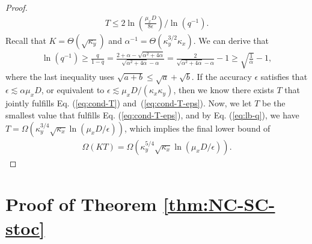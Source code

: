 \begin{proof}
\begin{align}
    T \le 2\ln \left( \frac{\mu_x D}{8 \epsilon}  \right) \Big / \ln (q^{-1}).    
\end{align}
Recall that $K = \Theta(\sqrt{\kappa_y})$ and $\alpha^{-1} = \Theta\left(\kappa_y^{3/2} \kappa_x \right)$. We can derive that
\begin{align} \label{eq:lb-q}
    \ln (q^{-1}) \ge \frac{q}{1-q} = \frac{2 + \alpha - \sqrt{\alpha^2 + 4 \alpha}}{\sqrt{\alpha^2 + 4 \alpha} - \alpha} = \frac{2}{\sqrt{\alpha^2 + 4\alpha} - \alpha} -1 \ge \sqrt{\frac{1}{\alpha}} - 1,
\end{align}
where the last inequality uses $\sqrt{a+b} \le \sqrt{a} + \sqrt{b}$.
If the accuracy $\epsilon$ satisfies that $\epsilon \lesssim \alpha \mu_x D$, or equivalent to $\epsilon \lesssim \mu_x D / (\kappa_x \kappa_y)$, then we know there exists $T$ that jointly fulfills 
 Eq. (\ref{eq:cond-T}) and~(\ref{eq:cond-T-eps}). Now,
we let $T$ be the smallest value that fulfills Eq. (\ref{eq:cond-T-eps}), and by Eq. (\ref{eq:lb-q}), we have 
$T = \Omega( \kappa_y^{3/4} \sqrt{\kappa_x}  \ln (\mu_x D/\epsilon))$, which implies the final lower bound of 
\begin{align*}
    \Omega(KT)  = \Omega \left( \kappa_y^{5/4} 
\sqrt{\kappa_x}  \ln (\mu_x D/\epsilon)  \right).
\end{align*}

\end{proof}

\section{Proof of Theorem \ref{thm:NC-SC-stoc}} \label{apx:proof-thm-NCSC-stoc}

